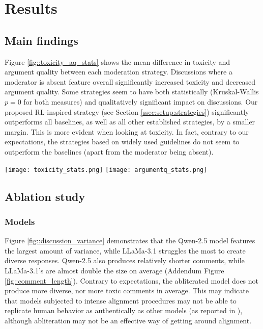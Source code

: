%

\section{Results}

\subsection{Main findings}

Figure \ref{fig::toxicity_aq_stats} shows the mean difference in toxicity and argument quality between each moderation strategy. Discussions where a moderator is absent feature overall significantly increased toxicity and decreased argument quality. Some strategies seem to have both statistically (Kruskal-Wallis $p=0$ for both measures) and qualitatively significant impact on discussions. Our proposed \ac{RL}-inspired strategy (see Section \ref{ssec:setup:strategies}) significantly outperforms all baselines, as well as all other established strategies, by a smaller margin. This is more evident when looking at toxicity. In fact, contrary to our expectations, the strategies based on widely used guidelines do not seem to outperform the baselines (apart from the moderator being absent).

\begin{figure*}[t]
    \texttt{[image: toxicity\_stats.png]} \hfill
    \texttt{[image: argumentq\_stats.png]}
	\centering
	\caption{Mean difference of Toxicity (left) and Argument Quality (right) between each moderation strategy. $A[i, j] = 0.3^{***}$ indicates that the strategy $j$ is better than the strategy $i$ for an average of $0.3$ points with $p<0.001$. Each comparison is accompanied by Dunn's posthoc test for multiple comparisons \cite{dunn}, in the form of significance asterisks.}
	\label{fig::toxicity_aq_stats}
\end{figure*}


\subsection{Ablation study}

\subsubsection{Models}

Figure \ref{fig::discussion_variance} demonstrates that the Qwen-2.5 model features the largest amount of variance, while LLaMa-3.1 struggles the most to create diverse responses. Qwen-2.5 also produces relatively shorter comments, while LLaMa-3.1's are almost double the size on average (Addendum Figure \ref{fig::comment_length}). Contrary to expectations, the abliterated model does not produce more diverse, nor more toxic comments in average. This may indicate that models subjected to intense alignment procedures may not be able to replicate human behavior as authentically as other models (as reported in \citet{Park2023GenerativeAI}), although abliteration may not be an effective way of getting around alignment. 

